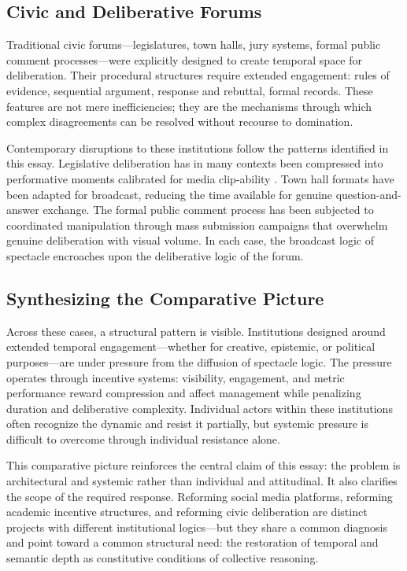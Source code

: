 \documentclass[12pt]{article}
\begin{document}
\subsection{Civic and Deliberative Forums}

Traditional civic forums---legislatures, town halls, jury systems, formal public comment processes---were explicitly designed to create temporal space for deliberation. Their procedural structures require extended engagement: rules of evidence, sequential argument, response and rebuttal, formal records. These features are not mere inefficiencies; they are the mechanisms through which complex disagreements can be resolved without recourse to domination.

Contemporary disruptions to these institutions follow the patterns identified in this essay. Legislative deliberation has in many contexts been compressed into performative moments calibrated for media clip-ability \citep{Mutz2015}. Town hall formats have been adapted for broadcast, reducing the time available for genuine question-and-answer exchange. The formal public comment process has been subjected to coordinated manipulation through mass submission campaigns that overwhelm genuine deliberation with visual volume. In each case, the broadcast logic of spectacle encroaches upon the deliberative logic of the forum.

\subsection{Synthesizing the Comparative Picture}

Across these cases, a structural pattern is visible. Institutions designed around extended temporal engagement---whether for creative, epistemic, or political purposes---are under pressure from the diffusion of spectacle logic. The pressure operates through incentive systems: visibility, engagement, and metric performance reward compression and affect management while penalizing duration and deliberative complexity. Individual actors within these institutions often recognize the dynamic and resist it partially, but systemic pressure is difficult to overcome through individual resistance alone.

This comparative picture reinforces the central claim of this essay: the problem is architectural and systemic rather than individual and attitudinal. It also clarifies the scope of the required response. Reforming social media platforms, reforming academic incentive structures, and reforming civic deliberation are distinct projects with different institutional logics---but they share a common diagnosis and point toward a common structural need: the restoration of temporal and semantic depth as constitutive conditions of collective reasoning.
\end{document}

